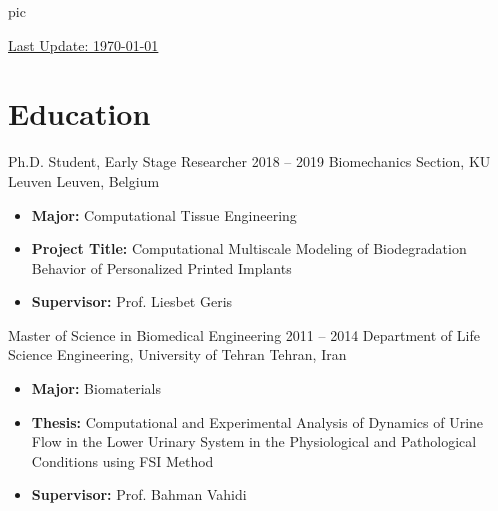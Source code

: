 \documentclass{cv}
\begin{document}
{{pic}}


\noindent
{\footnotesize  \underline{Last Update: \today{}}}





\section{Education}

\longdatedsubsection
{Ph.D. Student, Early Stage Researcher}
{2018 -- 2019} 
{Biomechanics Section, KU Leuven} 
{Leuven, Belgium} 

\begin{itemize}

\item 
\textbf{Major:} Computational Tissue Engineering

\item
\textbf{Project Title:} Computational Multiscale Modeling of Biodegradation Behavior of Personalized Printed Implants

\item
\textbf{Supervisor:} Prof. Liesbet Geris

\end{itemize}

\longdatedsubsection
{Master of Science in Biomedical Engineering}
{2011 -- 2014} 
{Department of Life Science Engineering, University of Tehran} 
{Tehran, Iran} 

\begin{itemize}

\item 
\textbf{Major:} Biomaterials

\item
\textbf{Thesis:} Computational and Experimental Analysis of Dynamics of Urine Flow in the Lower Urinary System in the Physiological and Pathological Conditions using FSI Method

\item
\textbf{Supervisor:} Prof. Bahman Vahidi


\end{itemize}
\end{document}
